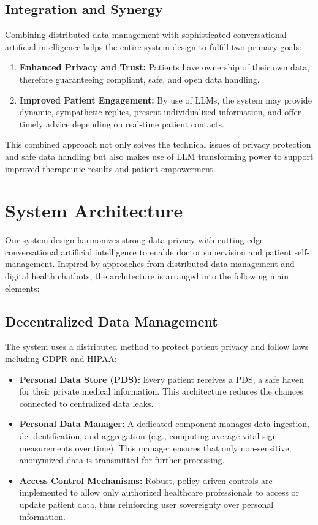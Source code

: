 \subsection{Integration and Synergy}
Combining distributed data management with sophisticated conversational artificial intelligence helps the entire system design to fulfill two primary goals:
\begin{enumerate}[itemsep=2em]
    \item \textbf{Enhanced Privacy and Trust:} Patients have ownership of their own data, therefore guaranteeing compliant, safe, and open data handling.
    \item \textbf{Improved Patient Engagement:} By use of LLMs, the system may provide dynamic, sympathetic replies, present individualized information, and offer timely advice depending on real-time patient contacts.
\end{enumerate}

This combined approach not only solves the technical issues of privacy protection and safe data handling but also makes use of LLM transforming power to support improved therapeutic results and patient empowerment.

\section{System Architecture}
\label{sec:system_architecture}

Our system design harmonizes strong data privacy with cutting-edge conversational artificial intelligence to enable doctor supervision and patient self-management. Inspired by approaches from distributed data management and digital health chatbots, the architecture is arranged into the following main elements:

\subsection{Decentralized Data Management}
The system uses a distributed method to protect patient privacy and follow laws including GDPR and HIPAA:
\begin{itemize}[itemsep=2em]
    \item \textbf{Personal Data Store (PDS):} Every patient receives a PDS, a safe haven for their private medical information. This architecture reduces the chances connected to centralized data leaks.
    \item \textbf{Personal Data Manager:} A dedicated component manages data ingestion, de-identification, and aggregation (e.g., computing average vital sign measurements over time). This manager ensures that only non-sensitive, anonymized data is transmitted for further processing.
    \item \textbf{Access Control Mechanisms:} Robust, policy-driven controls are implemented to allow only authorized healthcare professionals to access or update patient data, thus reinforcing user sovereignty over personal information.
\end{itemize}

